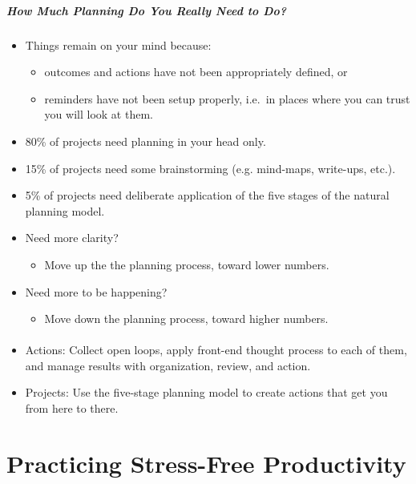 \documentclass{article}
\begin{document}
\subparagraph{How Much Planning Do You Really Need to Do?}

\begin{itemize}
  \item Things remain on your mind because:
  \begin{itemize}
    \item outcomes and actions have not been appropriately defined, or
    \item reminders have not been setup properly, i.e.\ in places where you can trust you will look at them.
  \end{itemize}
  \item 80\% of projects need planning in your head only.
  \item 15\% of projects need some brainstorming (e.g. mind-maps, write-ups, etc.).
  \item 5\%  of projects need deliberate application of the five stages of the natural planning model.
  \item Need more clarity?
  \begin{itemize}
    \item Move up the the planning process, toward lower numbers.
  \end{itemize}
  \item Need more to be happening?
  \begin{itemize}
    \item Move down the planning process, toward higher numbers.
  \end{itemize}
\end{itemize}

\paragraph{}

\begin{itemize}
  \item Actions: Collect open loops, apply front-end thought process to each of them, and manage results with organization, review, and action.
  \item Projects: Use the five-stage planning model to create actions that get you from here to there.
\end{itemize}

\section{Practicing Stress-Free Productivity}
\end{document}

